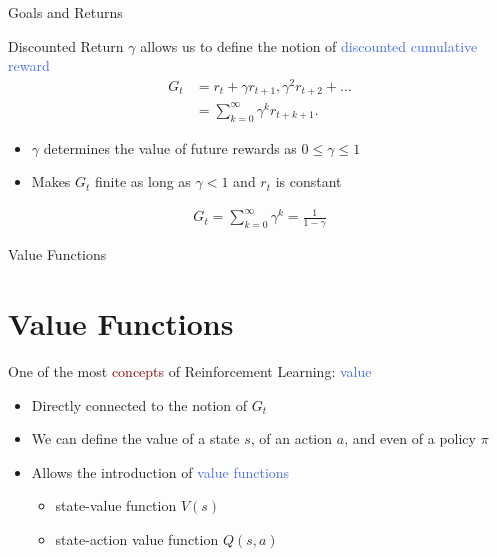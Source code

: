 \documentclass{beamer}
\begin{document}
\begin{frame}{Goals and Returns}
	\begin{block}{Discounted Return}
  	 $\gamma$ allows us to define the notion of \textcolor{RoyalBlue}{discounted cumulative reward}	
		\begin{align*}
			G_t & = r_t+\gamma r_{t+1}, \gamma^{2} r_{t+2} + ... \\
				& = \sum_{k=0}^{\infty}\gamma^{k} r_{t+k+1}.
		\end{align*}

	\end{block}

	\begin{itemize}
		\item $\gamma$ determines the value of future rewards as $0\leq\gamma\leq1$
		\item Makes $G_t$ finite as long as $\gamma < 1$ and $r_t$ is constant
	\end{itemize}
	
	\centering
	\begin{align*}
		G_t = \sum_{k=0}^{\infty}\gamma^{k} = \frac{1}{1-\gamma}
	\end{align*}

\end{frame}



\begin{frame}{Value Functions}
	\section{Value Functions}

	One of the most \textcolor{Maroon}{concepts} of Reinforcement Learning: \textcolor{RoyalBlue}{value}
	\begin{itemize}
		\item Directly connected to the notion of $G_t$
		\item We can define the value of a state $s$, of an action $a$, and even of a policy $\pi$
		\item Allows the introduction of \textcolor{RoyalBlue}{value functions}
			\begin{itemize}
				\item state-value function $V(s)$
				\item state-action value function $Q(s,a)$
			\end{itemize}
	\end{itemize}
\end{frame}
\end{document}
